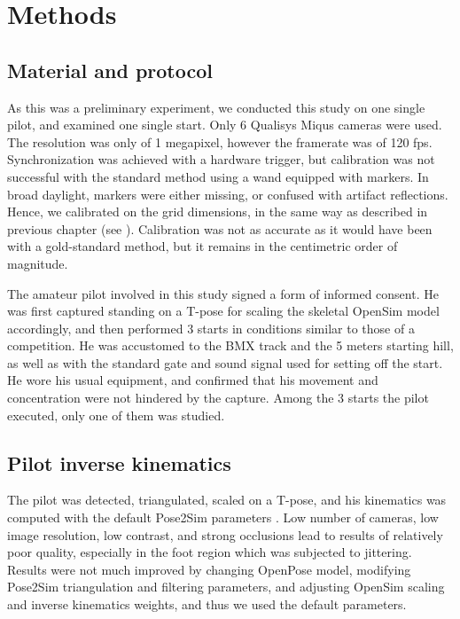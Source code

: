 \section{Methods}

\subsection{Material and protocol}
As this was a preliminary experiment, we conducted this study on one single pilot, and examined one single start. Only 6 Qualisys Miqus cameras were used. The resolution was only of 1 megapixel, however the framerate was of 120 fps. Synchronization was achieved with a hardware trigger, but calibration was not successful with the standard method using a wand equipped with markers. In broad daylight, markers were either missing, or confused with artifact reflections. Hence, we calibrated on the grid dimensions, in the same way as described in previous chapter (see ). Calibration was not as accurate as it would have been with a gold-standard method, but it remains in the centimetric order of magnitude.

The amateur pilot involved in this study signed a form of informed consent. He was first captured standing on a T-pose for scaling the skeletal OpenSim model accordingly, and then performed 3 starts in conditions similar to those of a competition. He was accustomed to the BMX track and the 5 meters starting hill, as well as with the standard gate and sound signal used for setting off the start. He wore his usual equipment, and confirmed that his movement and concentration were not hindered by the capture. Among the 3 starts the pilot executed, only one of them was studied. 


\subsection{Pilot inverse kinematics}

The pilot was detected, triangulated, scaled on a T-pose, and his kinematics was computed with the default Pose2Sim parameters \cite{Pagnon2022b}. Low number of cameras, low image resolution, low contrast, and strong occlusions lead to results of relatively poor quality, especially in the foot region which was subjected to jittering. Results were not much improved by changing OpenPose model, modifying Pose2Sim triangulation and filtering parameters, and adjusting OpenSim scaling and inverse kinematics weights, and thus we used the default parameters.


